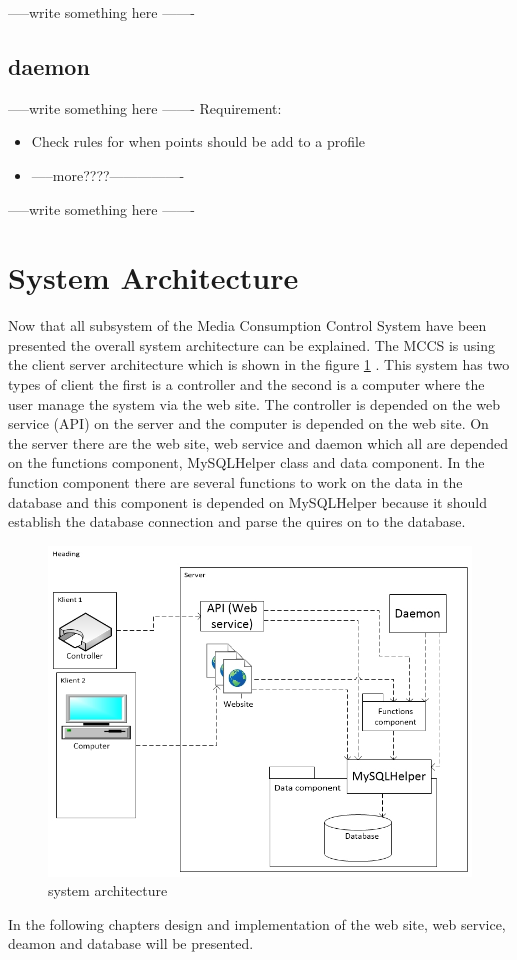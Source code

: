-----write something here -------


\subsection{daemon}
\label{subsec:daemon}
-----write something here -------
Requirement:
\begin{itemize}
	\item Check rules for when points should be add to a profile
	\item -----more????----------------
\end{itemize}
-----write something here -------


\section{System Architecture}
\label{sec:sysArchitecture}
Now that all subsystem of the Media Consumption Control System have been presented the overall system architecture can be explained. The MCCS is using the client server architecture which is shown in the figure \ref{fig:serveroverview} \citep{OOAD}. This system has two types of client the first is a controller and the second is a computer where the user manage the system via the web site. The controller is depended on the web service (API) on the server and the computer is depended on the web site. On the server there are the web site, web service and daemon which all are depended on the functions component, MySQLHelper class and data component. In the function component there are several functions to work on the data in the database and this component is depended on MySQLHelper because it should establish the database connection and parse the quires on to the database. 

\begin{figure}
	\centering
		\includegraphics[width=1.00\textwidth]{images/serveroverview.jpg}
	\caption{system architecture}
	\label{fig:serveroverview}
\end{figure}

In the following chapters design and implementation of the web site, web service, deamon and database will be presented.

 



